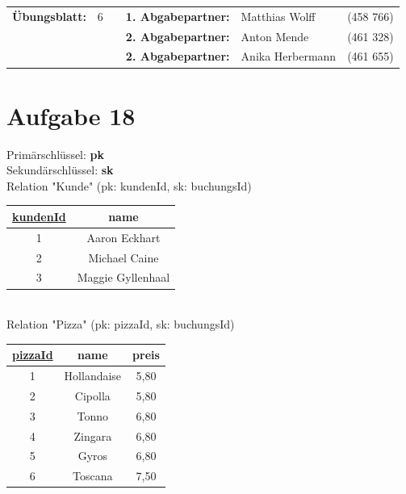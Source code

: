 \newcommand{\obenlinks}{Software Engineering}		%

\usepackage{float}


	\begin{center}
		\begin{tabular}{|rlp{4cm}rll|}
		\hline
		 \textbf{Übungsblatt:} & 6 &   & \textbf{1. Abgabepartner:} & Matthias Wolff & (458 766)  \\
		        & & & \textbf{2. Abgabepartner:} & Anton Mende & (461 328) \\
		        & & & \textbf{2. Abgabepartner:} & Anika Herbermann & (461 655) \\ \hline
		\end{tabular}
	\end{center}




\section*{Aufgabe 18}

Primärschlüssel: \textbf{pk}\\
Sekundärschlüssel: \textbf{sk}\\
Relation "Kunde" (pk: kundenId, sk: buchungsId)\\
\begin{tabular} {|c|c|}
\rowcolor{Gray}\hline
\underline{kundenId} \phantom{a}&name\\\hline
1&Aaron Eckhart\\\hline
2&Michael Caine\\\hline
3&Maggie Gyllenhaal\\\hline
\end{tabular}\\

Relation "Pizza" (pk: pizzaId, sk: buchungsId)\\
\begin{tabular} {|c|c|c|}
	\rowcolor{Gray}\hline
	\underline{pizzaId}&name&preis\\\hline
	1&Hollandaise&5,80\\\hline
	2&Cipolla&5,80\\\hline
	3&Tonno&6,80\\\hline
	4&Zingara&6,80\\\hline
	5&Gyros&6,80\\\hline
	6&Toscana&7,50\\\hline
\end{tabular}\\

